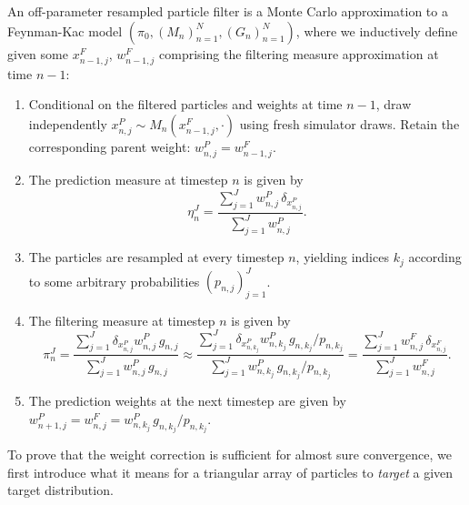 \documentclass[11pt]{article}
\theoremstyle{thmstylethree}%
\begin{document}
\begin{defn}
    \label{defn:off-parameter-filter}
    An off-parameter resampled particle filter is a Monte Carlo approximation to a Feynman-Kac model $\left(\pi_0,\left(M_n\right)_{n=1}^N,\left(G_n\right)_{n=1}^N\right)$, where we inductively define given some $x_{n-1,j}^F$, $w_{n-1,j}^F$ comprising the filtering measure approximation at time $n-1$:
    \begin{enumerate}
        \item Conditional on the filtered particles and weights at time $n-1$,
        draw independently $x_{n,j}^P\sim M_n(x_{n-1,j}^F,\cdot)$ using fresh
        simulator draws. Retain the corresponding parent weight:
        $w_{n,j}^P=w_{n-1,j}^F$.
        \item The prediction measure at timestep $n$ is given by 
        \begin{equation}
        \eta_n^J = \frac{\sum_{j=1}^J w_{n,j}^P \, \delta_{x_{n,j}^P}}{\sum_{j=1}^J w_{n,j}^P}.
        \end{equation}
        \item The particles are resampled at every timestep $n$, yielding indices $k_j$ according to some arbitrary probabilities $(p_{n,j})_{j=1}^J$.
        \item The filtering measure at timestep $n$ is given by
        \begin{equation}
        \pi_n^J = \frac{\sum_{j=1}^J \delta_{x_{n,j}^P } w_{n,j}^P \, g_{n,j}}{\sum_{j=1}^J w_{n,j}^P \, g_{n,j}} \approx \frac{\sum_{j=1}^J \delta_{x_{n,k_j}^P }w_{n,k_j}^P \, g_{n,k_j}\big/p_{n,k_j}}{\sum_{j=1}^J w_{n,k_j}^P\, g_{n,k_j}\big/p_{n,k_j}} = \frac{\sum_{j=1}^J w_{n,j}^F \, \delta_{x_{n,j}^F}}{\sum_{j=1}^J w_{n,j}^F}.
        \end{equation}
        \item The prediction weights at the next timestep are given by $w_{n+1,j}^P = w_{n,j}^F =  w_{n,k_j}^P \, g_{n,k_j}\big/p_{n,k_j}$.
    \end{enumerate}
\end{defn}

To prove that the weight correction is sufficient for almost sure convergence, we first introduce what it means for a triangular array of particles to \textit{target} a given target distribution. 
\end{document}
